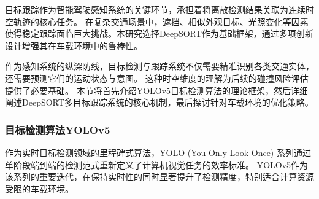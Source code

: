 \documentclass[a4paper, UTF8, fontsize=12pt]{ctexart} %
\numberwithin{equation}{section} %
\begin{document}
目标跟踪作为智能驾驶感知系统的关键环节，承担着将离散检测结果关联为连续时空轨迹的核心任务。
在复杂交通场景中，遮挡、相似外观目标、光照变化等因素使得稳定跟踪面临巨大挑战。本研究选择DeepSORT作为基础框架，通过多项创新设计增强其在车载环境中的鲁棒性。

作为感知系统的纵深防线，目标检测与跟踪系统不仅需要精准识别各类交通实体，还需要预测它们的运动状态与意图。
这种时空维度的理解为后续的碰撞风险评估提供了必要基础。
本节将首先介绍YOLOv5目标检测算法的理论框架，然后详细阐述DeepSORT多目标跟踪系统的核心机制，最后探讨针对车载环境的优化策略。

\subsubsection{目标检测算法YOLOv5}

作为实时目标检测领域的里程碑式算法，YOLO (You Only Look Once) 系列通过单阶段端到端的检测范式重新定义了计算机视觉任务的效率标准。
YOLOv5作为该系列的重要迭代，在保持实时性的同时显著提升了检测精度，特别适合计算资源受限的车载环境。
\end{document}
